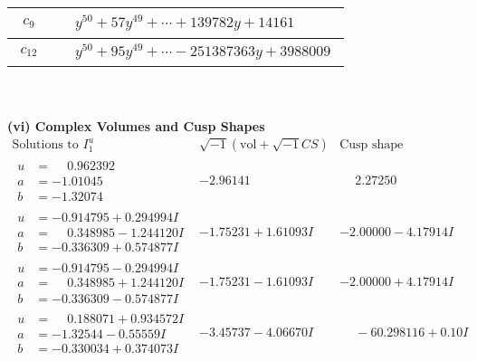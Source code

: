\documentclass[1p]{elsarticle_modified}
\theoremstyle{definition}
\newcommand{\I}{\sqrt{-1}}
\begin{document}
\begin{tabular}{m{50pt}|m{274pt}}
\hline $$\begin{aligned}c_{9}\end{aligned}$$&$\begin{aligned}
&y^{50}+57 y^{49}+\cdots+139782 y+14161
\end{aligned}$\\
\hline $$\begin{aligned}c_{12}\end{aligned}$$&$\begin{aligned}
&y^{50}+95 y^{49}+\cdots-251387363 y+3988009
\end{aligned}$\\
\hline
\end{tabular}\\~\\
\newpage\flushleft \textbf{(vi) Complex Volumes and Cusp Shapes}
$$\begin{array}{c|c|c}  
\text{Solutions to }I^u_{1}& \I (\text{vol} + \sqrt{-1}CS) & \text{Cusp shape}\\
 \hline 
\begin{aligned}
u &= \phantom{-}0.962392\phantom{ +0.000000I} \\
a &= -1.01045\phantom{ +0.000000I} \\
b &= -1.32074\phantom{ +0.000000I}\end{aligned}
 & -2.96141\phantom{ +0.000000I} & \phantom{-}2.27250\phantom{ +0.000000I} \\ \hline\begin{aligned}
u &= -0.914795 + 0.294994 I \\
a &= \phantom{-}0.348985 - 1.244120 I \\
b &= -0.336309 + 0.574877 I\end{aligned}
 & -1.75231 + 1.61093 I & -2.00000 - 4.17914 I \\ \hline\begin{aligned}
u &= -0.914795 - 0.294994 I \\
a &= \phantom{-}0.348985 + 1.244120 I \\
b &= -0.336309 - 0.574877 I\end{aligned}
 & -1.75231 - 1.61093 I & -2.00000 + 4.17914 I \\ \hline\begin{aligned}
u &= \phantom{-}0.188071 + 0.934572 I \\
a &= -1.32544 - 0.55559 I \\
b &= -0.330034 + 0.374073 I\end{aligned}
 & -3.45737 - 4.06670 I & \phantom{-}                -6
0.298116 + 0. 10   I\phantom{ +0.000000I} \\ \hline\begin{aligned}

\end{aligned}
\end{array}$$
\end{document}
